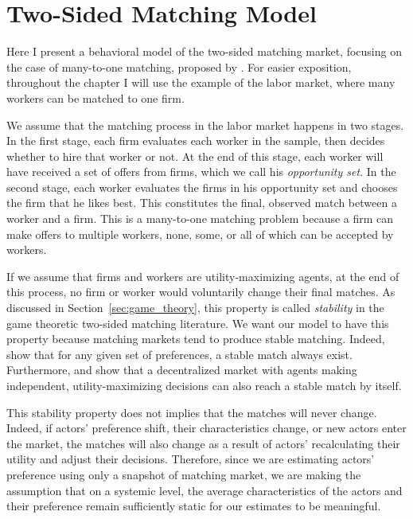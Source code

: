 \chapter{Two-Sided Matching Model}
\label{chap:model}

Here I present a behavioral model of the two-sided matching market, focusing on
the case of many-to-one matching, proposed by \cite{Logan1996}. For easier
exposition, throughout the chapter I will use the example of the labor market,
where many workers can be matched to one firm.

We assume that the matching process in the labor market happens in two stages.
In the first stage, each firm evaluates each worker in the sample, then decides
whether to hire that worker or not. At the end of this stage, each worker will
have received a set of offers from firms, which we call his \textit{opportunity
  set}. In the second stage, each worker evaluates the firms in his opportunity
set and chooses the firm that he likes best. This constitutes the final,
observed match between a worker and a firm. This is a many-to-one matching
problem because a firm can make offers to multiple workers, none, some, or all
of which can be accepted by workers.

If we assume that firms and workers are utility-maximizing agents, at the end of
this process, no firm or worker would voluntarily change their final matches. As
discussed in Section~\ref{sec:game_theory}, this property is called
\textit{stability} in the game theoretic two-sided matching literature. We want
our model to have this property because matching markets tend to produce stable
matching. Indeed, \citet{Roth1992} show that for any given set of preferences, a
stable match always exist. Furthermore, \citet{Roth2016} and \citet{Adachi2003}
show that a decentralized market with agents making independent,
utility-maximizing decisions can also reach a stable match by itself.

This stability property does not implies that the matches will never change.
Indeed, if actors' preference shift, their characteristics change, or new actors
enter the market, the matches will also change as a result of actors'
recalculating their utility and adjust their decisions. Therefore, since we are
estimating actors' preference using only a snapshot of matching market, we are
making the assumption that on a systemic level, the average characteristics of
the actors and their preference remain sufficiently static for our estimates to
be meaningful.

